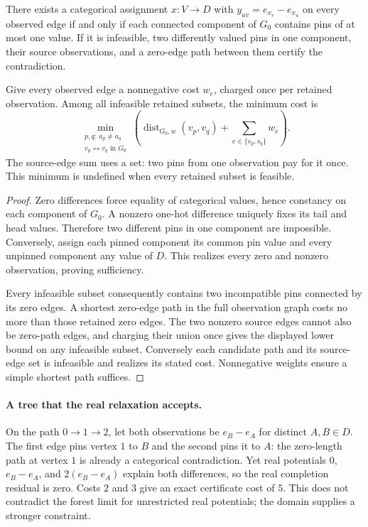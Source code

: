 \documentclass[11pt,a4paper]{article}
\begin{document}
\begin{theorem}
\label{thm:categorical-certificate}
There exists a categorical assignment $x:V\to D$ with
$y_{uv}=e_{x_v}-e_{x_u}$ on every observed edge if and only if each connected
component of $G_0$ contains pins of at most one value. If it is infeasible,
two differently valued pins in one component, their source observations, and
a zero-edge path between them certify the contradiction.

Give every observed edge a nonnegative cost $w_e$, charged once per retained
observation. Among all infeasible retained subsets, the minimum cost is
\[
 \min_{\substack{p,q:\ a_p\ne a_q\\ v_p\leftrightarrow v_q\text{ in }G_0}}
 \left(\operatorname{dist}_{G_0,w}(v_p,v_q)
       +\sum_{e\in\{s_p,s_q\}}w_e\right).
\]
The source-edge sum uses a set: two pins from one observation pay for it once.
This minimum is undefined when every retained subset is feasible.
\end{theorem}
\begin{proof}
Zero differences force equality of categorical values, hence constancy on each
component of $G_0$. A nonzero one-hot difference uniquely fixes its tail and
head values. Therefore two different pins in one component are impossible.
Conversely, assign each pinned component its common pin value and every
unpinned component any value of $D$. This realizes every zero and nonzero
observation, proving sufficiency.

Every infeasible subset consequently contains two incompatible pins connected
by its zero edges. A shortest zero-edge path in the full observation graph
costs no more than those retained zero edges. The two nonzero source edges
cannot also be zero-path edges, and charging their union once gives the
displayed lower bound on any infeasible subset. Conversely each candidate
path and its source-edge set is infeasible and realizes its stated cost.
Nonnegative weights ensure a simple shortest path suffices.
\end{proof}

\paragraph{A tree that the real relaxation accepts.}
On the path $0\to1\to2$, let both observations be $e_B-e_A$ for distinct
$A,B\in D$. The first edge pins vertex $1$ to $B$ and the second pins it to
$A$: the zero-length path at vertex $1$ is already a categorical contradiction.
Yet real potentials $0$, $e_B-e_A$, and $2(e_B-e_A)$ explain both differences,
so the real completion residual is zero. Costs $2$ and $3$ give an exact
certificate cost of $5$. This does not contradict the forest limit for
unrestricted real potentials; the domain supplies a stronger constraint.
\end{document}
